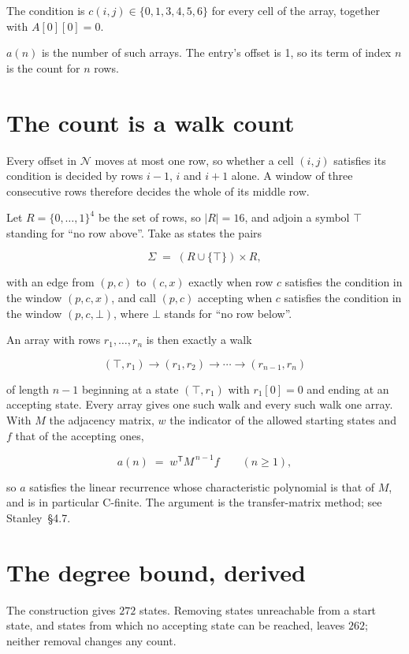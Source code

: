 \documentclass[11pt]{article}
\theoremstyle{definition}
\begin{document}
The condition is $c(i,j) \in \{0, 1, 3, 4, 5, 6\}$ for every cell of the array, together with $A[0][0]=0$.

$a(n)$ is the number of such arrays. The entry's offset is 1, so its term of index $n$ is the count for $n$ rows.

\section{The count is a walk count}

Every offset in $\mathcal{N}$ moves at most one row, so whether a cell $(i,j)$ satisfies its condition is decided by rows $i-1$, $i$ and $i+1$ alone. A window of three consecutive rows therefore decides the whole of its middle row.

Let $R = \{0,\dots,1\}^{4}$ be the set of rows, so $|R| = 16$, and adjoin a symbol $\top$ standing for ``no row above''. Take as states the pairs

\[\Sigma \;=\; (R \cup \{\top\}) \times R,\]

with an edge from $(p,c)$ to $(c,x)$ exactly when row $c$ satisfies the condition in the window $(p,c,x)$, and call $(p,c)$ accepting when $c$ satisfies the condition in the window $(p,c,\bot)$, where $\bot$ stands for ``no row below''.

An array with rows $r_1,\dots,r_n$ is then exactly a walk

\[(\top,r_1) \to (r_1,r_2) \to \cdots \to (r_{n-1},r_n)\]

of length $n-1$ beginning at a state $(\top,r_1)$ with $r_1[0]=0$ and ending at an accepting state. Every array gives one such walk and every such walk one array. With $M$ the adjacency matrix, $w$ the indicator of the allowed starting states and $f$ that of the accepting ones,

\[a(n) \;=\; w^{\mathsf T} M^{\,n-1} f \qquad (n \ge 1),\]

so $a$ satisfies the linear recurrence whose characteristic polynomial is that of $M$, and is in particular C-finite. The argument is the transfer-matrix method; see Stanley~\S4.7.

\section{The degree bound, derived}

The construction gives $272$ states. Removing states unreachable from a start state, and states from which no accepting state can be reached, leaves $262$; neither removal changes any count.
\end{document}
